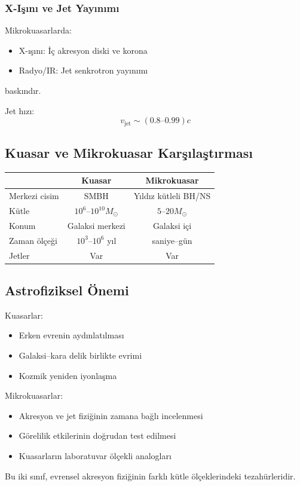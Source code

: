 \subsubsection{X-Işını ve Jet Yayınımı}

Mikrokuasarlarda:
\begin{itemize}
    \item X-ışını: İç akresyon diski ve korona
    \item Radyo/IR: Jet senkrotron yayınımı
\end{itemize}
baskındır.

Jet hızı:
\begin{equation}
v_{\mathrm{jet}} \sim (0.8\text{--}0.99)c
\end{equation}

\subsection{Kuasar ve Mikrokuasar Karşılaştırması}

\begin{center}
\begin{tabular}{lcc}
\hline
 & Kuasar & Mikrokuasar \\
\hline
Merkezi cisim & SMBH & Yıldız kütleli BH/NS \\
Kütle & $10^6$--$10^{10} M_\odot$ & $5$--$20 M_\odot$ \\
Konum & Galaksi merkezi & Galaksi içi \\
Zaman ölçeği & $10^3$--$10^6$ yıl & saniye--gün \\
Jetler & Var & Var \\
\hline
\end{tabular}
\end{center}

\subsection{Astrofiziksel Önemi}

Kuasarlar:
\begin{itemize}
    \item Erken evrenin aydınlatılması
    \item Galaksi–kara delik birlikte evrimi
    \item Kozmik yeniden iyonlaşma
\end{itemize}

Mikrokuasarlar:
\begin{itemize}
    \item Akresyon ve jet fiziğinin zamana bağlı incelenmesi
    \item Görelilik etkilerinin doğrudan test edilmesi
    \item Kuasarların laboratuvar ölçekli analogları
\end{itemize}

Bu iki sınıf, evrensel akresyon fiziğinin farklı kütle ölçeklerindeki tezahürleridir.
